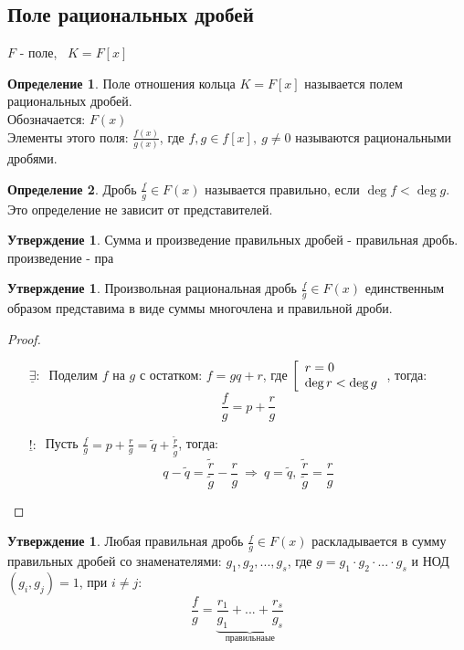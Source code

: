 \documentclass[a4paper, 12pt]{article}
\newcommand\tab[1][.5cm]{\hspace*{#1}}
\newcounter{thcount}
\newcounter{subthcount}
\theoremstyle{definition}
\newtheorem*{definition}{Определение}
\newtheorem{subtheoremnum}[subthcount]{Утверждение}
\begin{document}
  \subsection{Поле рациональных дробей}
  $F$ - поле, \ $K = F[x]$
  \begin{definition}
    Поле отношения кольца $K = F[x]$ называется полем рациональных дробей.\\
    Обозначается: $F(x)$\\
    Элементы этого поля: $\frac{f(x)}{g(x)}$, где $f, g \in f[x], \ g\neq 0$ называются рациональными дробями.    
  \end{definition}
  \begin{definition}
    Дробь $\frac{f}{g} \in F(x)$ называется правильно, если $\deg f < \deg g$. Это определение не зависит от представителей.
  \end{definition}
  \begin{subtheoremnum}
    Сумма и произведение правильных дробей - правильная дробь. произведение - пра
  \end{subtheoremnum}
  \begin{subtheoremnum}
    Произвольная рациональная дробь $\frac{f}{g} \in F(x)$ единственным образом представима в виде суммы многочлена и правильной дроби.
  \end{subtheoremnum}
  \begin{proof}\tab
    \begin{itemize}
      \item[$\underline{\exists} : \ $ ] Поделим $f$ на $g$ с остатком: $f = gq + r$, где $\left[ \begin{array}{l l}
        r=0\\
        \deg r < \deg g
        \end{array} \right.$, тогда: 
        $$\frac{f}{g} = p + \frac{r}{g}$$ 
      \item[$\underline{!} : \ $ ] Пусть $\frac{f}{g} = p + \frac{r}{g} = \widetilde{q} + \frac{\widetilde{r}}{\widetilde{g}}$, тогда: 
      $$q - \widetilde{q} = \frac{\widetilde{r}}{\widetilde{g}} - \frac{r}{g} \ \Longrightarrow  \ q = \widetilde{q}, \ \frac{\widetilde{r}}{\widetilde{g}} = \frac{r}{g}$$ 
    \end{itemize}
  \end{proof} 
  \begin{subtheoremnum}
    Любая правильная дробь $\frac{f}{g} \in F(x)$ раскладывается в сумму правильных дробей со знаменателями: $g_1, g_2,...,g_s$, где $g = g_1 \cdot g_2 \cdot ... \cdot g_s$ и НОД$(g_i, g_j) = 1$, при $i \neq j$:
    $$\frac{f}{g} = \underbrace{\frac{r_1}{g_1} + ... + \frac{r_s}{g_s}}_{ \text{правильнаые}}$$
  \end{subtheoremnum}
\end{document}
